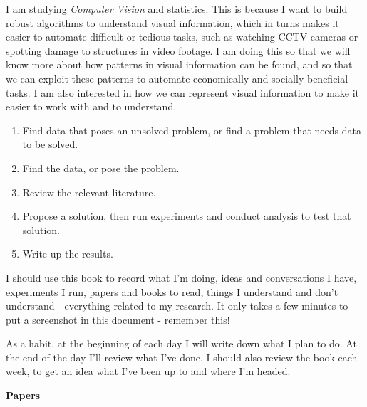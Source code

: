 \documentclass[idxtotoc,hyperref,openany]{labbook} %
\begin{document}
I am studying \emph{Computer Vision} and statistics. This is because I want to build robust algorithms to understand visual information, which in turns makes it easier to automate difficult or tedious tasks, such as watching CCTV cameras or spotting damage to structures in video footage. I am doing this so that we will know more about how patterns in visual information can be found, and so that we can exploit these patterns to automate economically and socially beneficial tasks. I am also interested in how we can represent visual information to make it easier to work with and to understand.

\begin{enumerate}
\item Find data that poses an unsolved problem, or find a problem that needs data to be solved.
\item Find the data, or pose the problem.
\item Review the relevant literature.
\item Propose a solution, then run experiments and conduct analysis to test that solution.
\item Write up the results.
\end{enumerate}

I should use this book to record what I'm doing, ideas and conversations I have, experiments I run, papers and books to read, things I understand and don't understand - everything related to my research. It only takes a few minutes to put a screenshot in this document - remember this!

As a habit, at the beginning of each day I will write down what I plan to do. At the end of the day I'll review what I've done. I should also review the book each week, to get an idea what I've been up to and where I'm headed.

\newpage
{\hspace{5cm} \Huge\textbf{Papers} \hfill}
\\
\end{document}
